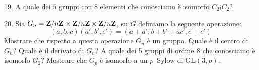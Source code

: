 \item{19.} A quale dei $5$ gruppi con $8$ elementi che conosciamo \`{e} isomorfo 
$C_2\wr C_2$?

\item{20.} Sia $G_n={\bf Z}/n{\bf Z}\times{\bf Z}/n{\bf Z}\times{\bf Z}/n{\bf Z}$,
su $G$ definiamo la seguente operazione:
$$(a,b,c)(a',b',c')=(a+a',b+b'+ac',c+c')$$
 Mostrare che rispetto a questa operazione $G_n$ \`{e} un gruppo.
 Quale \`{e} il centro di $G_n$?
 Quale \`{e} il derivato di $G_n$?
 A quale dei 5 gruppi di ordine 8 che conosciamo \`{e} isomorfo $G_2$?
 Mostrare che $G_p$ \`{e} isomorfo a un $p$--Sylow di GL$(3,p)$.
\bye


